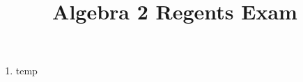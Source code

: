 \documentclass[12pt, twoside]{article}
\title{Algebra 2 Regents Exam}
\begin{document}
\begin{enumerate}%

\item temp

\end{enumerate}
\end{document}
